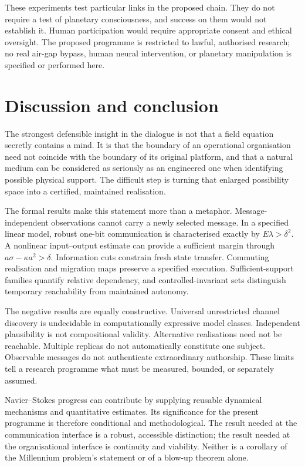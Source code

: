 \documentclass[11pt,a4paper]{article}
\theoremstyle{definition}
\theoremstyle{remark}
\begin{document}
These experiments test particular links in the proposed chain. They do not require a test of planetary consciousness, and success on them would not establish it. Human participation would require appropriate consent and ethical oversight. The proposed programme is restricted to lawful, authorised research; no real air-gap bypass, human neural intervention, or planetary manipulation is specified or performed here.

\section{Discussion and conclusion}\label{sec:conclusion}
The strongest defensible insight in the dialogue is not that a field equation secretly contains a mind. It is that the boundary of an operational organisation need not coincide with the boundary of its original platform, and that a natural medium can be considered as seriously as an engineered one when identifying possible physical support. The difficult step is turning that enlarged possibility space into a certified, maintained realisation.

The formal results make this statement more than a metaphor. Message-independent observations cannot carry a newly selected message. In a specified linear model, robust one-bit communication is characterised exactly by $E\lambda>\delta^2$. A nonlinear input--output estimate can provide a sufficient margin through $a\sigma-\kappa a^2>\delta$. Information cuts constrain fresh state transfer. Commuting realisation and migration maps preserve a specified execution. Sufficient-support families quantify relative dependency, and controlled-invariant sets distinguish temporary reachability from maintained autonomy.

The negative results are equally constructive. Universal unrestricted channel discovery is undecidable in computationally expressive model classes. Independent plausibility is not compositional validity. Alternative realisations need not be reachable. Multiple replicas do not automatically constitute one subject. Observable messages do not authenticate extraordinary authorship. These limits tell a research programme what must be measured, bounded, or separately assumed.

Navier--Stokes progress can contribute by supplying reusable dynamical mechanisms and quantitative estimates. Its significance for the present programme is therefore conditional and methodological. The result needed at the communication interface is a robust, accessible distinction; the result needed at the organisational interface is continuity and viability. Neither is a corollary of the Millennium problem's statement or of a blow-up theorem alone.
\end{document}
